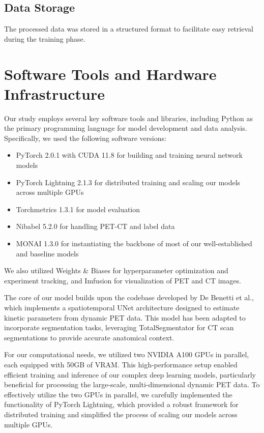 \subsection{Data Storage}
The processed data was stored in a structured format to facilitate easy retrieval during the training phase.

\section{Software Tools and Hardware Infrastructure}
Our study employs several key software tools and libraries, including Python as the primary programming language for model development and data analysis. Specifically, we used the following software versions:

\begin{itemize}
    \item PyTorch 2.0.1 with CUDA 11.8 for building and training neural network models
    \item PyTorch Lightning 2.1.3 for distributed training and scaling our models across multiple GPUs
    \item Torchmetrics 1.3.1 for model evaluation
    \item Nibabel 5.2.0 for handling PET-CT and label data
    \item MONAI 1.3.0 for instantiating the backbone of most of our well-established and baseline models
\end{itemize}

We also utilized Weights \& Biases for hyperparameter optimization and experiment tracking, and Imfusion for visualization of PET and CT images.

The core of our model builds upon the codebase developed by De Benetti et al., which implements a spatiotemporal UNet architecture designed to estimate kinetic parameters from dynamic PET data. This model has been adapted to incorporate segmentation tasks, leveraging TotalSegmentator for CT scan segmentations to provide accurate anatomical context.

For our computational needs, we utilized two NVIDIA A100 GPUs in parallel, each equipped with 50GB of VRAM. This high-performance setup enabled efficient training and inference of our complex deep learning models, particularly beneficial for processing the large-scale, multi-dimensional dynamic PET data. To effectively utilize the two GPUs in parallel, we carefully implemented the functionality of PyTorch Lightning, which provided a robust framework for distributed training and simplified the process of scaling our models across multiple GPUs.
